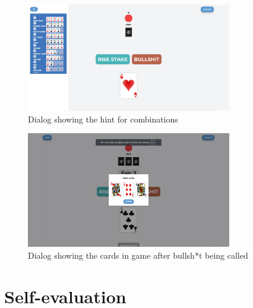 \documentclass{scrartcl}
\begin{document}
\begin{figure}
      \centering
      \includegraphics[width=0.8\textwidth]{figures/hintScreenshot.png}
      \caption{Dialog showing the hint for combinations}
      \label{fig:screenshot7}
\end{figure}

\begin{figure}
      \centering
      \includegraphics[width=0.8\textwidth]{figures/cardsInGameScreenshot.png}
      \caption{Dialog showing the cards in game after bullsh*t being called}
      \label{fig:screenshot8}
\end{figure}

\newpage
\section{Self-evaluation}\label{self-evaluation}
\end{document}
